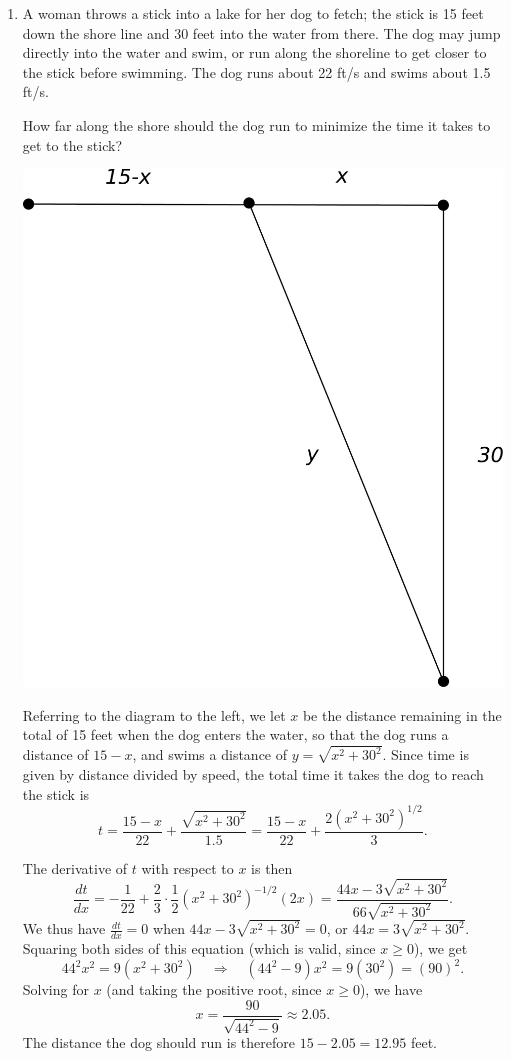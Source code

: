 \documentclass[12pt]{article}
\begin{document}
\thispagestyle{fancy}

\begin{enumerate}
 \item A woman throws a stick into a lake for her dog to fetch; the stick is 15 feet down the shore line and 30 feet into the water from there. The dog may jump directly into the water and swim, or run along the shoreline to get closer to the stick before swimming. The dog runs about 22 ft/s and swims about 1.5 ft/s.

How far along the shore should the dog run to minimize the time it takes to get to the stick?

\medskip

\begin{multicols}{2}
 \begin{center}
  \includegraphics[width=0.6\columnwidth]{WS8-1sol}
 \end{center}
 \columnbreak
 Referring to the diagram to the left, we let $x$ be the distance remaining in the total of 15 feet when the dog enters the water, so that the dog runs a distance of $15-x$, and swims a distance of $y=\sqrt{x^2+30^2}$. Since time is given by distance divided by speed, the total time it takes the dog to reach the stick is
\[
 t = \frac{15-x}{22}+\frac{\sqrt{x^2+30^2}}{1.5} = \frac{15-x}{22}+\frac{2(x^2+30^2)^{1/2}}{3}.
\]
\end{multicols}
The derivative of $t$ with respect to $x$ is then
\[
 \frac{dt}{dx} = -\frac{1}{22}+\frac{2}{3}\cdot\frac{1}{2}(x^2+30^2)^{-1/2}(2x) = \frac{44x-3\sqrt{x^2+30^2}}{66\sqrt{x^2+30^2}}.
\]
We thus have $\frac{dt}{dx}=0$ when $44x-3\sqrt{x^2+30^2}=0$, or $44x=3\sqrt{x^2+30^2}$. Squaring both sides of this equation (which is valid, since $x\geq 0$), we get
\[
 44^2x^2=9(x^2+30^2) \quad \Rightarrow \quad (44^2-9)x^2 = 9(30^2) = (90)^2.
\]
Solving for $x$ (and taking the positive root, since $x\geq 0$), we have
\[
 x = \frac{90}{\sqrt{44^2-9}}\approx 2.05.
\]
The distance the dog should run is therefore $15-2.05 = 12.95$ feet.


\end{enumerate}
\end{document}

